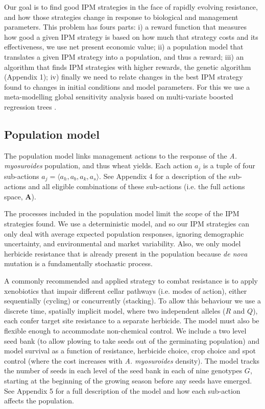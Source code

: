 \documentclass[12pt, a4paper]{article}
\begin{document}
Our goal is to find good IPM strategies in the face of rapidly evolving resistance, and how those strategies change in response to biological and management parameters. This problem has fours parts: i) a reward function that measures how good a given IPM strategy is based on how much that strategy costs and its effectiveness, we use net present economic value; ii) a population model that translates a given IPM strategy into a population, and thus a reward; iii) an algorithm that finds IPM strategies with higher rewards, the genetic algorithm (Appendix 1); iv) finally we need to relate changes in the best IPM strategy found to changes in initial conditions and model parameters. For this we use a meta-modelling global sensitivity analysis \citep{Cout2014} based on multi-variate boosted regression trees \citep{Mill2016}. 

\subsection*{Population model}
The population model links management actions to the response of the \textit{A. myosuroides} population, and thus wheat yields. Each action $a_j$ is a tuple of four sub-actions $a_j = \langle a_h, a_b, a_k, a_s \rangle$. See Appendix 4 for a description of the sub-actions and all eligible combinations of these sub-actions (i.e. the full actions space, $\mathbf{A}$). 

The processes included in the population model limit the scope of the IPM strategies found. We use a deterministic model, and so our IPM strategies can only deal with average expected population responses, ignoring demographic uncertainty, and environmental and market variability. Also, we only model herbicide resistance that is already present in the population because \textit{de nova} mutation is a fundamentally stochastic process. 

A commonly recommended \citep{REX2013} and applied \citep{Hick2018} strategy to combat resistance is to apply xenobiotics that impair different cellar pathways (i.e. modes of action), either sequentially (cycling) or concurrently (stacking). To allow this behaviour we use a discrete time, spatially implicit model, where two independent alleles ($R$ and $Q$), each confer target site resistance to a separate herbicide. The model must also be flexible enough to accommodate non-chemical control. We include a two level seed bank (to allow plowing to take seeds out of the germinating population) and model survival as a function of resistance, herbicide choice, crop choice and spot control (where the cost increases with \textit{A. myosuroides} density). The model tracks the number of seeds in each level of the seed bank in each of nine genotypes $G$, starting at the beginning of the growing season before any seeds have emerged. See Appendix 5 for a full description of the model and how each sub-action affects the population. 
\end{document}
